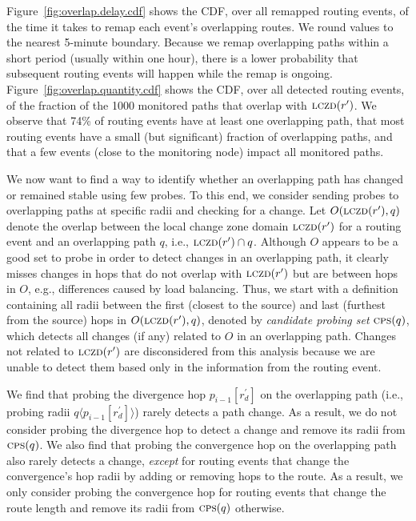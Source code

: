 
Figure~\ref{fig:overlap.delay.cdf} shows the CDF, over all remapped
routing events, of the time it takes to remap each event's
overlapping routes.  We round values to the nearest 5-minute
boundary.  Because we remap overlapping paths within a short period
(usually within one hour), there is a lower probability that
subsequent routing events will happen while the remap is ongoing.
Figure~\ref{fig:overlap.quantity.cdf} shows the CDF, over all
detected routing events, of the fraction of the 1000 monitored paths
that overlap with $\mathrm{\textsc{lczd}}(r')$.  We observe that 74\% of routing
events have at least one overlapping path, that most routing events
have a small (but significant) fraction of overlapping paths, and
that a few events (close to the monitoring node) impact all
monitored paths.

  We now want to find a way
to identify whether an overlapping path has changed or remained
stable using few probes.  To this end, we consider sending probes to
overlapping paths at specific radii and checking for a change.  Let
$O(\mathrm{\textsc{lczd}}(r'), q)$ denote the overlap between the local change zone
domain $\mathrm{\textsc{lczd}}(r')$ for a routing event and an overlapping path $q$,
i.e., $\mathrm{\textsc{lczd}}(r')\cap{}q$. Although $O$ appears to be a good set to
probe in order to detect changes in an overlapping path, it clearly 
misses changes in hops that do not overlap with $\mathrm{\textsc{lczd}}(r')$ but are
between hops in $O$, e.g., differences caused by load balancing.  
Thus, we start with a definition containing all radii between 
the first (closest to the source) and last (furthest from the source) 
hops in $O(\mathrm{\textsc{lczd}}(r'), q)$, denoted by \emph{candidate probing
set} $\mathrm{\textsc{cps}}(q)$, which detects all changes (if any) related to $O$ in an
overlapping path. Changes not related to $\mathrm{\textsc{lczd}}(r')$ are disconsidered 
from this analysis because we are unable to detect them based only
in the information from the routing event.


We find that probing the divergence hop $p_{i-1}[r^\prime_d]$ on the
overlapping path (i.e., probing radii $q\langle p_{i-1}[r^\prime_d]
\rangle$) rarely detects a path change.  As a result, we do not
consider probing the divergence hop to detect a change and remove
its radii from $\mathrm{\textsc{cps}}(q)$.\footnotemark{}  We also find that probing
the convergence hop on the overlapping path also rarely detects
a change, \emph{except} for routing events that change the
convergence's hop radii by adding or removing hops to the route.  As
a result, we only consider probing the convergence hop for routing
events that change the route length and remove its radii from
$\mathrm{\textsc{cps}}(q)$ otherwise.

